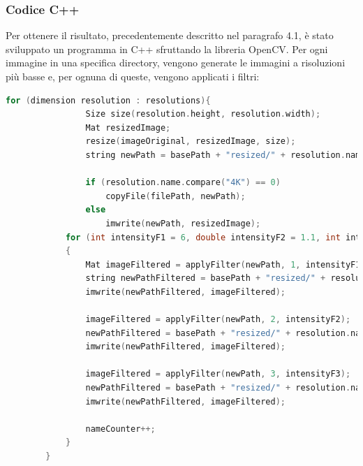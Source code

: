\documentclass[a4paper,11pt]{article}
\begin{document}
    \subsubsection{Codice C++}
    Per ottenere il risultato, precedentemente descritto nel paragrafo 4.1, è stato sviluppato un programma in C++ sfruttando la libreria OpenCV.
    Per ogni immagine in una specifica directory, vengono generate le immagini a risoluzioni più basse e, per ognuna di queste, vengono applicati i filtri:
    \begin{lstlisting}[language=C++]
        for (dimension resolution : resolutions){
				Size size(resolution.height, resolution.width);
				Mat resizedImage;
				resize(imageOriginal, resizedImage, size);
				string newPath = basePath + "resized/" + resolution.name + "/" + fileName + ".tif";

				if (resolution.name.compare("4K") == 0) 
					copyFile(filePath, newPath);
				else
					imwrite(newPath, resizedImage);
            for (int intensityF1 = 6, double intensityF2 = 1.1, int intensityF3 = 5; intensityF1 <= 56, intensityF2 <= 1.5; intensityF3 <= 15; intensityF1 += 25, intensityF2 += 0.2, intensityF3 += 5) 
            {    
                Mat imageFiltered = applyFilter(newPath, 1, intensityF1);
                string newPathFiltered = basePath + "resized/" + resolution.name + "/filters/" + explode(fileName, '_')[0] + "_B" + to_string(nameCounter) + ".tif";
                imwrite(newPathFiltered, imageFiltered);
                
                imageFiltered = applyFilter(newPath, 2, intensityF2);
                newPathFiltered = basePath + "resized/" + resolution.name + "/filters/" + explode(fileName, '_')[0] + "_B" + to_string(nameCounter+3) + ".tif";
                imwrite(newPathFiltered, imageFiltered);

                imageFiltered = applyFilter(newPath, 3, intensityF3);
                newPathFiltered = basePath + "resized/" + resolution.name + "/filters/" + explode(fileName, '_')[0] + "_B" + to_string(nameCounter+6) + ".tif";
                imwrite(newPathFiltered, imageFiltered);

                nameCounter++;
            }
        }
    \end{lstlisting}

    \newpage
\end{document}
